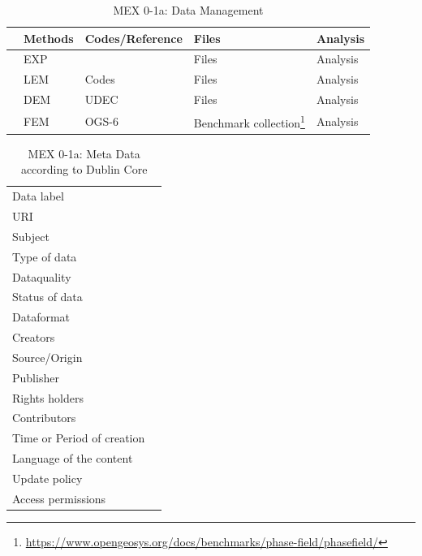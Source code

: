 
\begin{table}[h!]
\footnotesize
\centering
\caption{MEX 0-1a: Data Management}
\label{tab:schedule}
\begin{tabular}{|L{0.5cm}|L{1cm}|L{2cm}|L{3cm}|L{1cm}|} 
\hline
 & Methods & Codes/Reference & Files & Analysis \\ \hline
 & EXP & \cite{} & Files & Analysis \\ \hline
 & LEM & Codes & Files & Analysis \\ \hline
 & DEM & UDEC & Files & Analysis \\ \hline
 & FEM & OGS-6 & Benchmark collection\footnote{\url{https://www.opengeosys.org/docs/benchmarks/phase-field/phasefield/}} & Analysis \\ \hline
\end{tabular}
\end{table}
\normalsize

\begin{table}[h!]
\caption{MEX 0-1a: Meta Data according to Dublin Core}
\label{tab:}
\small
\begin{tabular}{R{3cm}|L{7cm}}
\hline
%
Data label &  \\
URI &  \\
Subject  &  \\
Type of data  &  \\
Dataquality  &  \\
Status of data  &  \\
Dataformat  & \\
Creators  &  \\
Source/Origin &  \\
Publisher  &  \\
Rights holders &  \\
Contributors &  \\
Time or Period of creation &  \\
Language of the content &  \\
Update policy &  \\
Access permissions &  \\
%
\hline
\end{tabular}
\end{table}

